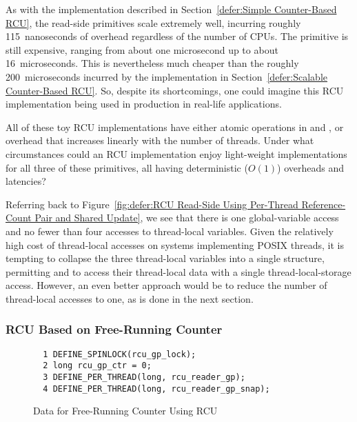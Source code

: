 As with the implementation described in
Section~\ref{defer:Simple Counter-Based RCU},
the read-side primitives scale extremely well, incurring roughly
115~nanoseconds of overhead regardless of the number of CPUs.
The  primitive is still expensive,
ranging from about one microsecond up to about 16~microseconds.
This is nevertheless much cheaper than the roughly 200~microseconds
incurred by the implementation in
Section~\ref{defer:Scalable Counter-Based RCU}.
So, despite its shortcomings, one could imagine this
RCU implementation being used in production in real-life applications.

\QuickQuiz{}
	All of these toy RCU implementations have either atomic operations
	in  and ,
	or 
	overhead that increases linearly with the number of threads.
	Under what circumstances could an RCU implementation enjoy
	light-weight implementations for all three of these primitives,
	all having deterministic ($O\left(1\right)$) overheads and latencies?
 \QuickQuizEnd

Referring back to
Figure~\ref{fig:defer:RCU Read-Side Using Per-Thread Reference-Count Pair and Shared Update},
we see that there is one global-variable access and no fewer than four
accesses to thread-local variables.
Given the relatively high cost of thread-local accesses on systems
implementing POSIX threads, it is tempting to collapse the three
thread-local variables into a single structure, permitting
 and  to access their
thread-local data with a single thread-local-storage access.
However, an even better approach would be to reduce the number of
thread-local accesses to one, as is done in the next section.

\subsubsection{RCU Based on Free-Running Counter}
\label{defer:RCU Based on Free-Running Counter}

\begin{figure}[tbp]
{ \scriptsize
\begin{verbatim}
  1 DEFINE_SPINLOCK(rcu_gp_lock);
  2 long rcu_gp_ctr = 0;
  3 DEFINE_PER_THREAD(long, rcu_reader_gp);
  4 DEFINE_PER_THREAD(long, rcu_reader_gp_snap);
\end{verbatim}
}
\caption{Data for Free-Running Counter Using RCU}
\label{fig:defer:Data for Free-Running Counter Using RCU}
\end{figure}

